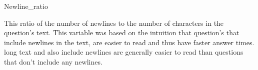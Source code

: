 \documentclass[12pt]{article}
\begin{document}
Newline\_ratio

This ratio of the number of newlines to the number of characters in the question's text. This variable was based on the intuition that question's that include newlines in the text, are easier to read and thus have faster answer times. long text and also include newlines are generally easier to read than questions that don’t include any newlines. 



\end{document}
